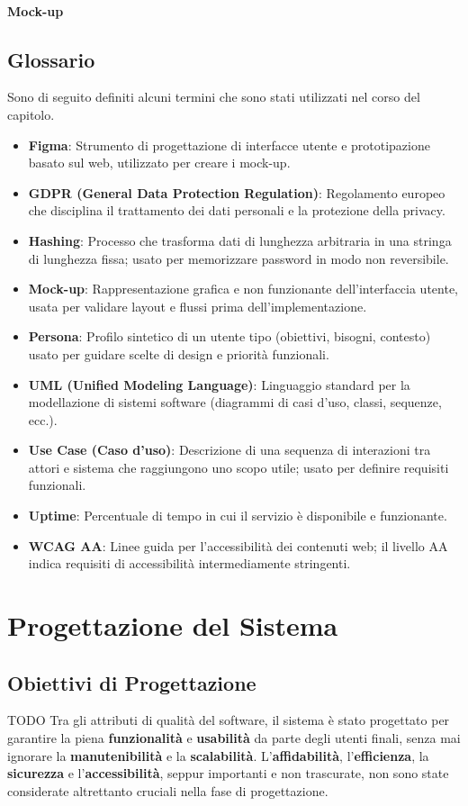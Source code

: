 \documentclass{book}
\begin{document}
\subsubsection{Mock-up}

\section{Glossario}
Sono di seguito definiti alcuni termini che sono stati utilizzati nel corso del capitolo.
\begin{itemize}
  \item \textbf{Figma}: Strumento di progettazione di interfacce utente e prototipazione basato sul web, utilizzato per creare i mock-up.
  \item \textbf{GDPR (General Data Protection Regulation)}: Regolamento europeo che disciplina il trattamento dei dati personali e la protezione della privacy.
  \item \textbf{Hashing}: Processo che trasforma dati di lunghezza arbitraria in una stringa di lunghezza fissa; usato per memorizzare password in modo non reversibile.
  \item \textbf{Mock-up}: Rappresentazione grafica e non funzionante dell'interfaccia utente, usata per validare layout e flussi prima dell'implementazione.
  \item \textbf{Persona}: Profilo sintetico di un utente tipo (obiettivi, bisogni, contesto) usato per guidare scelte di design e priorità funzionali.
  \item \textbf{UML (Unified Modeling Language)}: Linguaggio standard per la modellazione di sistemi software (diagrammi di casi d'uso, classi, sequenze, ecc.).
  \item \textbf{Use Case (Caso d'uso)}: Descrizione di una sequenza di interazioni tra attori e sistema che raggiungono uno scopo utile; usato per definire requisiti funzionali.
  \item \textbf{Uptime}: Percentuale di tempo in cui il servizio è disponibile e funzionante.
  \item \textbf{WCAG AA}: Linee guida per l'accessibilità dei contenuti web; il livello AA indica requisiti di accessibilità intermediamente stringenti.
\end{itemize}


\chapter{Progettazione del Sistema}
\section{Obiettivi di Progettazione}
TODO
Tra gli attributi di qualità del software, il sistema è stato progettato per garantire la piena \textbf{funzionalità} e \textbf{usabilità} da parte degli utenti finali, senza mai ignorare la \textbf{manutenibilità} e la \textbf{scalabilità}. L'\textbf{affidabilità}, l'\textbf{efficienza}, la \textbf{sicurezza} e l'\textbf{accessibilità}, seppur importanti e non trascurate, non sono state considerate altrettanto cruciali nella fase di progettazione.
\end{document}
